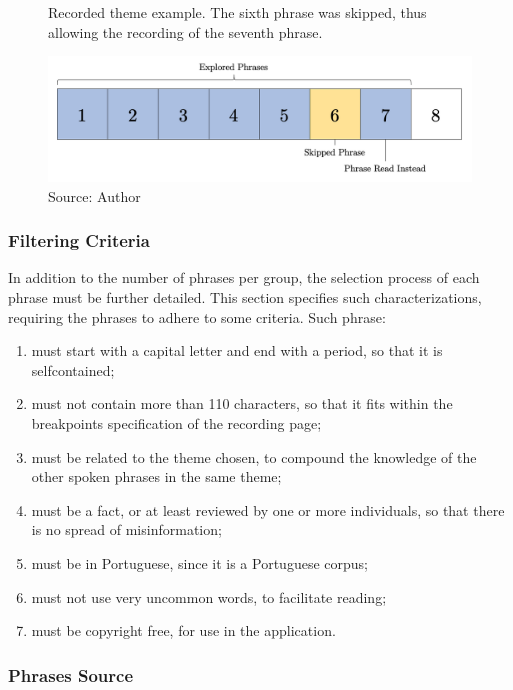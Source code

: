 \begin{figure}[h]
    \centering
    \caption{Recorded theme example. The sixth phrase was skipped, thus allowing the recording of the seventh phrase.}
    \includegraphics[width=\linewidth]{images/phrase-selection/phrase-skip.png}
    \caption*{Source: Author}
    \label{fig:falealgumacoisa-phrase-skip}
\end{figure}

\subsubsection{Filtering Criteria}

In addition to the number of phrases per group, the selection process of each phrase must be further detailed. This section specifies such characterizations, requiring the phrases to adhere to some criteria. Such phrase:

\begin{enumerate}
    \item must start with a capital letter and end with a period, so that it is selfcontained;
    \item must not contain more than 110 characters, so that it fits within the breakpoints specification of the recording page;
    \item must be related to the theme chosen, to compound the knowledge of the other spoken phrases in the same theme;
    \item must be a fact, or at least reviewed by one or more individuals, so that there is no spread of misinformation;
    \item must be in Portuguese, since it is a Portuguese corpus;
    \item must not use very uncommon words, to facilitate reading;
    \item must be copyright free, for use in the application.
\end{enumerate}

\subsubsection{Phrases Source}

